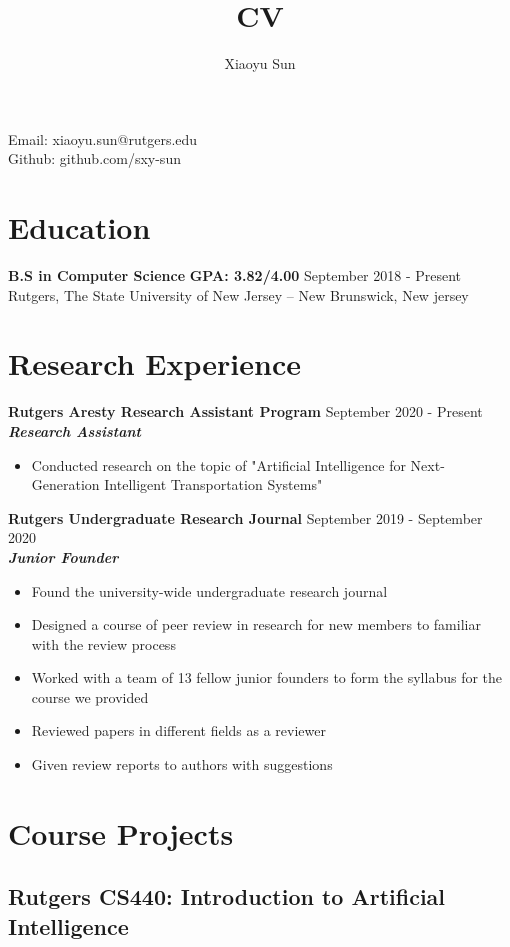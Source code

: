 \documentclass{article}
\makeatletter
\renewcommand{\maketitle}{
\begin{center}
{\huge\bfseries
\theauthor}

\vspace{.25em}

Email: xiaoyu.sun@rutgers.edu\\
Github: github.com/sxy-sun
\end{center}
}
\makeatother
\begin{document}
\title{CV}
\author{Xiaoyu Sun}
\maketitle

\section{Education}
\textbf{B.S in Computer Science} \space \textbf{GPA: 3.82/4.00}
\hfill{September 2018 - Present}\\
Rutgers, The State University of New Jersey – New Brunswick, New jersey

\section{Research Experience}
\textbf{Rutgers Aresty Research Assistant Program}
\hfill{September 2020 - Present}\\
\textit{\textbf{Research Assistant}}
\begin{itemize}
  \itemsep0em
  \item Conducted research on the topic of "Artificial Intelligence for Next-Generation Intelligent Transportation Systems"\\
\end{itemize}

\noindent \textbf{Rutgers Undergraduate Research Journal}
\hfill{September 2019 - September 2020}\\
\textit{\textbf{Junior Founder}}
\begin{itemize}
  \itemsep0em
  \item Found the university-wide undergraduate research journal
  \item Designed a course of peer review in research for new members to familiar with the
review process
  \item  Worked with a team of 13 fellow junior founders to form the syllabus for the course we
provided
  \item Reviewed papers in different fields as a reviewer
  \item Given review reports to authors with suggestions
\end{itemize}


\section{Course Projects}
\subsection*{Rutgers CS440: Introduction to Artificial Intelligence}
\end{document}
